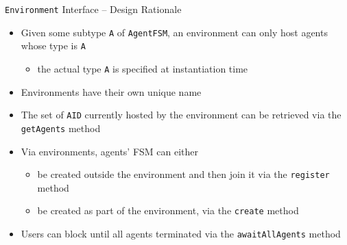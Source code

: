 \documentclass[presentation]{beamer}\mode<presentation>{\usetheme{AMSCesenaPurpleAndGold}}
\begin{document}
\begin{frame}{\texttt{Environment} Interface -- Design Rationale}

    \begin{itemize}

    	\item Given some subtype \texttt{A} of \texttt{AgentFSM}, an environment can only host agents whose type is \texttt{A}
    	\begin{itemize}
    		\item the actual type \texttt{A} is specified at instantiation time
    	\end{itemize}

	    \vfill

	    \item Environments have their own unique name

    	\vfill

    	\item The set of \texttt{AID} currently hosted by the environment can be retrieved via the \alert{\texttt{getAgents}} method

    	\vfill

        \item Via environments, agents' FSM can either
        \begin{itemize}
            \item be created outside the environment and then join it via the \alert{\texttt{register}} method
            \item be created as part of the environment, via the \alert{\texttt{create}} method
        \end{itemize}

    	\vfill

    	\item Users can block until all agents terminated via the \alert{\texttt{awaitAllAgents}} method

    \end{itemize}

\end{frame}
\end{document}
